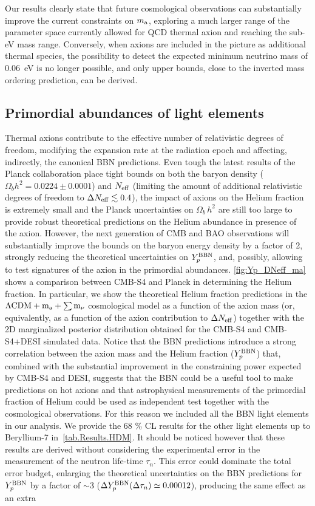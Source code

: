 \documentclass[fleqn,usenatbib,letters]{mnras}
\begin{document}
Our results clearly state that future cosmological observations can substantially improve the current constraints on $m_{\rm a}$, exploring a much larger range of the parameter space currently allowed for QCD thermal axion and reaching the sub-eV mass range. Conversely, when axions are included in the picture as additional thermal species, the possibility to detect the expected minimum neutrino mass of $0.06$~eV is no longer possible, and only upper bounds,  close to the inverted mass ordering prediction, can be derived.

\subsection{Primordial abundances of light elements}

Thermal axions contribute to the effective number of relativistic degrees of freedom, modifying the expansion rate at the radiation epoch and affecting, indirectly, the canonical BBN predictions. Even tough the latest results of the Planck collaboration place tight bounds on both the baryon density ($\Omega_b h^2 = 0.0224 \pm 0.0001$) and $N_{\rm{eff}}$ (limiting the amount of  additional relativistic degrees of freedom to $\Delta N_{\rm eff}\lesssim 0.4$), the impact of axions on the Helium fraction is extremely small and the Planck uncertainties on $\Omega_b\,h^2$ are still too large to provide robust theoretical predictions on the Helium abundance in presence of the axion. However, the next generation of CMB and BAO observations will substantially improve the bounds on the baryon energy density by a factor of 2, strongly reducing the theoretical uncertainties on $Y_p^{\rm BBN}$, and, possibly, allowing to test signatures of the axion in the primordial abundances. \autoref{fig:Yp_DNeff_ma} shows a comparison between CMB-S4 and Planck in determining the Helium fraction. In particular, we show the theoretical Helium fraction predictions in the $\Lambda\rm{CDM} + m_{\rm a} +\sum m_{\nu}$ cosmological model as a function of the axion mass (or, equivalently, as a function of the axion contribution to $\Delta N_{\rm eff}$) together with the 2D marginalized posterior distribution obtained for the CMB-S4 and CMB-S4+DESI simulated data. Notice that the BBN predictions introduce a strong correlation between the axion mass and the Helium fraction ($Y_p^{\rm BBN}$) that, combined with the substantial improvement in the constraining power expected by CMB-S4 and DESI, suggests that the BBN could be a useful tool to make predictions on hot axions and that astrophysical measurements of the primordial fraction of Helium could be used as independent test together with the cosmological observations. For this reason we included all the BBN light elements in our analysis. We provide the 68 \% CL results for the other light elements up to Beryllium-7 in~\autoref{tab.Results.HDM}. It should be noticed however that these results are derived without considering the experimental error in the measurement of the neutron life-time $\tau_n$. This error could dominate the total error budget, enlarging the theoretical uncertainties on the BBN predictions for $Y_p^{\rm BBN}$ by a factor of $\sim 3$ ($\Delta Y_p^{\rm BBN}(\Delta \tau_n)\simeq 0.00012$), producing the same effect as an extra 
\end{document}
